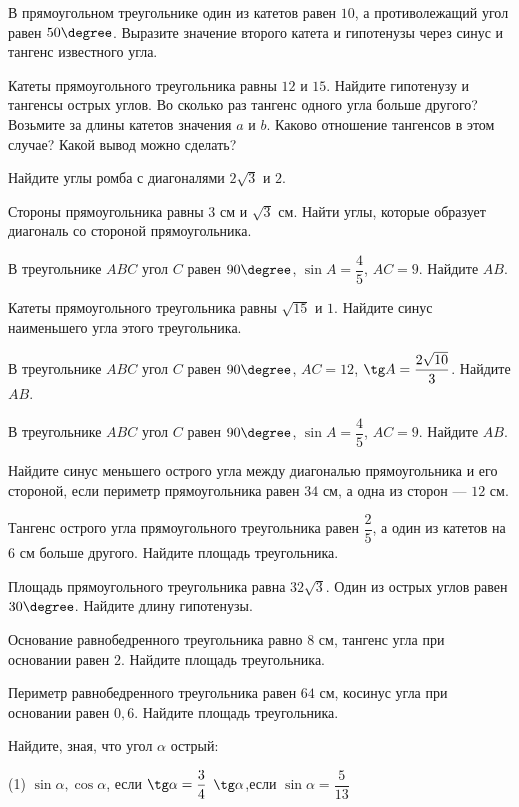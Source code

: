 \begin{class}[number=1]
\begin{listofex}[resume]
		\item В прямоугольном треугольнике один из катетов равен \( 10 \), а противолежащий угол равен \( 50\degree \). Выразите значение второго катета и гипотенузы через синус и тангенс известного угла.
		\item Катеты прямоугольного треугольника равны \( 12 \) и \( 15 \). Найдите гипотенузу и тангенсы острых углов. Во сколько раз тангенс одного угла больше другого? Возьмите за длины катетов значения \( a \) и \( b \). Каково отношение тангенсов в этом случае? Какой вывод можно сделать?
		\item Найдите углы ромба с диагоналями \( 2\sqrt{3} \) и \( 2 \).
		\item Стороны прямоугольника равны \( 3 \) см и \( \sqrt{3} \) см. Найти углы, которые образует диагональ со стороной прямоугольника.
		\item В треугольнике \( ABC \) угол \( C \) равен \( 90\degree \), \( \sin A=\dfrac{4}{5} \), \( AC=9 \). Найдите \( AB \).
		\end{listofex}
\end{class}

\begin{class}[number=2]
	\begin{listofex}
		\item Катеты прямоугольного треугольника равны \( \sqrt{15} \) и \( 1 \). Найдите синус наименьшего угла этого треугольника.
		\item В треугольнике \( ABC \) угол \( C \) равен \( 90\degree \), \( AC=12 \), \( \tg A=\dfrac{2\sqrt{10}}{3} \).  Найдите \( AB \).
		\item В треугольнике \( ABC \) угол \( C \) равен \( 90\degree \), \( \sin A=\dfrac{4}{5} \), \( AC=9 \). Найдите \( AB \).
		\item Найдите синус меньшего острого угла между	диагональю прямоугольника и его стороной, если периметр прямоугольника равен \( 34 \) см, а одна из сторон --- \( 12 \) см. 
		\item Тангенс острого угла прямоугольного треугольника равен \( \dfrac{2}{5} \), а один из катетов на \( 6 \) см больше другого. Найдите площадь треугольника. 
		\item Площадь прямоугольного треугольника равна \( 32\sqrt{3} \). Один из острых углов равен \( 30\degree \). Найдите длину гипотенузы.
		\item Основание равнобедренного треугольника равно \( 8 \) см, тангенс угла при основании равен \( 2 \). Найдите площадь треугольника. 
		\item Периметр равнобедренного треугольника равен \( 64 \) см, косинус угла при основании равен \( 0,6 \). Найдите площадь треугольника.
		\item Найдите, зная, что угол \( \alpha \) острый:
		\begin{tasks}(1)
			\task \( \sin\alpha, \cos\alpha \), \quad если \( \tg\alpha=\dfrac{3}{4} \)
			\task \( \tg \alpha \),\quad если \( \sin \alpha=\dfrac{5}{13} \)
		\end{tasks}
	\end{listofex}
\end{class}


